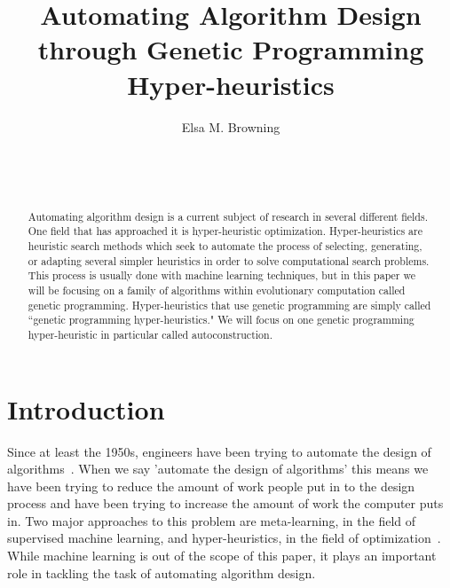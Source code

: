 \documentclass{sig-alternate}
\begin{document}

\title{Automating Algorithm Design through Genetic Programming Hyper-heuristics}


\author{
\alignauthor
Elsa M. Browning\\
	\\
	\\
	\\
}

\maketitle
\begin{abstract}
	Automating algorithm design is a current subject of research in several different fields. One field that has approached it is hyper-heuristic optimization. Hyper-heuristics are heuristic search methods which seek to automate the process of selecting, generating, or adapting several simpler heuristics in order to solve computational search problems. This process is usually done with machine learning techniques, but in this paper we will be focusing on a family of algorithms within evolutionary computation called genetic programming. Hyper-heuristics that use genetic programming are simply called ``genetic programming hyper-heuristics." We will focus on one genetic programming hyper-heuristic in particular called autoconstruction. 
\end{abstract}


\section{Introduction}
\label{sec:introduction}
Since at least the 1950s, engineers have been trying to automate the design of algorithms~\cite{pappa:2014}. When we say 'automate the design of algorithms' this means we have been trying to reduce the amount of work people put in to the design process and have been trying to increase the amount of work the computer puts in. Two major approaches to this problem are meta-learning, in the field of supervised machine learning, and hyper-heuristics, in the field of optimization~\cite{pappa:2014}. While machine learning is out of the scope of this paper, it plays an important role in tackling the task of automating algorithm design.
\end{document}

